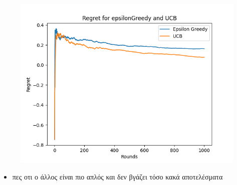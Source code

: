 \begin{figure}[h]
\begin{minipage}{.33\textwidth}
		\includegraphics[width=\linewidth]{Images/regret_1000_100.png}
		\label{fig:epsilon_10000_100}
	  \end{minipage}
	\end{figure}


\clearpage



\begin{itemize}
	\item πες οτι ο άλλος είναι πιο απλός και δεν βγάζει τόσο κακά αποτελέσματα
\end{itemize}